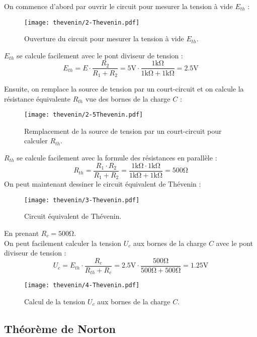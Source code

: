 On commence d'abord par ouvrir le circuit pour mesurer la tension à vide \(E_{th}\) :
\begin{figure}[H]
    \centering
    \texttt{[image: thevenin/2-Thevenin.pdf]}
    \caption{Ouverture du circuit pour mesurer la tension à vide \(E_{th}\).}
\end{figure}
\(E_{th}\) se calcule facilement avec le pont diviseur de tension :
\[
E_{th} = E \cdot \frac{R_2}{R_1+R_2} = 5\unit{\volt} \cdot \frac{1\unit{\kilo\ohm}}{1\unit{\kilo\ohm}+1\unit{\kilo\ohm}} = 2.5\unit{\volt}
\]

Ensuite, on remplace la source de tension par un court-circuit et on calcule la
r\'esistance \'equivalente \(R_{th}\) vue des bornes de la charge \(C\) :
\begin{figure}[H]
    \centering
    \texttt{[image: thevenin/2-5Thevenin.pdf]}
    \caption{Remplacement de la source de tension par un court-circuit pour calculer \(R_{th}\).}
\end{figure}
\(R_{th}\) se calcule facilement avec la formule des r\'esistances en parall\`ele :
\[
R_{th} = \frac{R_1 \cdot R_2}{R_1 + R_2} = \frac{1\unit{\kilo\ohm} \cdot 1\unit{\kilo\ohm}}{1\unit{\kilo\ohm} + 1\unit{\kilo\ohm}} = 500\unit{\ohm}
\]
On peut maintenant dessiner le circuit \'equivalent de Th\'evenin :
\begin{figure}[H]
    \centering
    \texttt{[image: thevenin/3-Thevenin.pdf]}
    \caption{Circuit \'equivalent de Th\'evenin.}
    \label{fig:thevenin-equivalent}
\end{figure}
En prenant \(R_c=500\unit{\ohm}\).\\
On peut facilement calculer la tension \(U_{c}\) aux bornes de la charge \(C\) avec le pont diviseur de tension :
\[
U_{c} = E_{th} \cdot \frac{R_c}{R_{th} + R_c} = 2.5\unit{\volt} \cdot \frac{500\unit{\ohm}}{500\unit{\ohm} + 500\unit{\ohm}} = 1.25\unit{\volt}
\]

\begin{figure}[H]
    \centering
    \texttt{[image: thevenin/4-Thevenin.pdf]}
    \caption{Calcul de la tension \(U_{c}\) aux bornes de la charge \(C\).}
\end{figure}



\subsection{Th\'eor\`eme de Norton}

